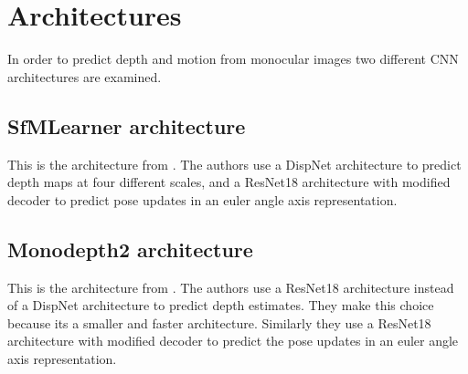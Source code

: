 \section{Architectures}

In order to predict depth and motion from monocular images two different CNN architectures are examined.

\subsection{SfMLearner architecture}
This is the architecture from \cite{sfmlearner}. The authors use a DispNet\cite{dispnet} architecture to predict depth maps at four different scales, and a ResNet18\cite{resnet} architecture with modified decoder to predict pose updates in an euler angle axis representation.



\subsection{Monodepth2 architecture}
This is the architecture from \cite{monodepth2}. The authors use a ResNet18 architecture instead of a DispNet architecture to predict depth estimates. They make this choice because its a smaller and faster architecture. Similarly they use a ResNet18 architecture with modified decoder to predict the pose updates in an euler angle axis representation.

